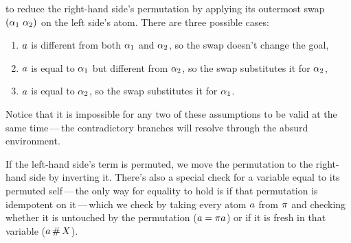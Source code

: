 \documentclass[english, mgr]{iithesis}
\newcommand{\mdash}{\,---\,}
\def\-{{\mdash}}
\begin{document}
to reduce the right-hand side's permutation by applying its outermost swap $(\alpha_1\ \alpha_2)$ on the left side's atom.
There are three possible cases: \begin{enumerate}[noitemsep]
    \item $a$ is different from both $\alpha_1$ and $\alpha_2$,
so the swap doesn't change the goal,
    \item $a$ is equal to $\alpha_1$ but different from $\alpha_2$,
so the swap substitutes it for $\alpha_2$,
    \item $a$ is equal to $\alpha_2$,
so the swap substitutes it for $\alpha_1$.
\end{enumerate}
Notice that it is impossible for any two of these assumptions to be valid at the same time\-the
contradictory branches will resolve through the absurd environment.

If the left-hand side's term is permuted, we move the permutation
to the right-hand side by inverting it.
There's also a special check for a variable equal to its permuted self\-the
only way for equality to hold is if that permutation is idempotent on it\-which
we check by taking every atom $a$ from $\pi$ and checking
whether it is untouched by the permutation ($a = \pi a$) or if it is fresh in that variable ($a \,\#\, X$).
\end{document}
